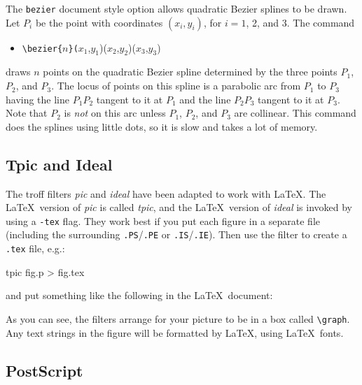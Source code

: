 The \verb|bezier| document style option allows quadratic Bezier
splines to be drawn.
Let $P_{i}$ be the point
with coordinates $(x_{i},y_{i})$, for $i=1$, 2, and 3.  The command
\begin{itemize} \tt
\item[]
\verb|\bezier{|$n$\verb|}(|$x_{1}$,$y_{1}$)($x_{2}$,$y_{2}$)($x_{3}$,$y_{3}$)
\end{itemize}
draws $n$ points on the quadratic Bezier spline determined by the three
points $P_{1}$, $P_{2}$, and $P_{3}$.  The locus of points on this
spline is a parabolic arc from $P_{1}$ to $P_{3}$ having the line
$P_{1}P_{2}$ tangent to it at $P_{1}$ and the line $P_{2}P_{3}$ tangent
to it at $P_{3}$.  Note that $P_{2}$ is {\em not\/} on this arc unless
$P_{1}$, $P_{2}$, and $P_{3}$ are collinear.
This command does the splines using little dots, so it is slow and
takes a lot of memory.

\subsection{Tpic and Ideal}

The troff filters {\em pic\/} and {\em ideal\/} have
been adapted to work with \LaTeX.
The \LaTeX\ version of {\em pic\/} is called {\em tpic},
and the \LaTeX\ version of {\em ideal\/} is invoked by
using a \verb|-tex| flag.
They work best if you put each figure in a separate file
(including the surrounding \verb|.PS|/\verb|.PE| or \verb|.IS|/\verb|.IE|).
Then use the filter to create a \verb|.tex| file, e.g.:
\begin{eg}
tpic fig.p > fig.tex
\end{eg}
and put something like the following in the \LaTeX\ document:
\begin{eg}

\begin{center}
\mbox{\box\graph}
\end{center}
\end{eg}
As you can see, the filters arrange for your picture to be in
a box called \verb|\graph|.
Any text strings in the figure will be formatted by \LaTeX,
using \LaTeX\ fonts.

\subsection{PostScript}

